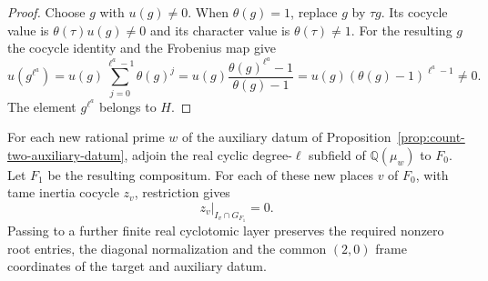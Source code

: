 \begin{proof}
Choose \(g\) with \(u(g)\ne0\). When \(\theta(g)=1\), replace \(g\)
by \(\tau g\). Its cocycle value is \(\theta(\tau)u(g)\ne0\) and
its character value is \(\theta(\tau)\ne1\).
For the resulting \(g\) the cocycle identity and the Frobenius map give
\[
 u(g^{\ell^a})=u(g)\sum_{j=0}^{\ell^a-1}\theta(g)^j
 =u(g)\frac{\theta(g)^{\ell^a}-1}{\theta(g)-1}
 =u(g)(\theta(g)-1)^{\ell^a-1}\ne0 .
\]
The element \(g^{\ell^a}\) belongs to \(H\).
\end{proof}

\begin{proposition}\label{prop:count-two-tame-return}
For each new rational prime \(w\) of the auxiliary datum of
Proposition~\ref{prop:count-two-auxiliary-datum}, adjoin the real
cyclic degree-\(\ell\) subfield of \(\mathbb Q(\mu_w)\) to \(F_0\).
Let \(F_1\) be the resulting compositum. For each of these new
places \(v\) of \(F_0\), with tame inertia cocycle \(z_v\), restriction gives
\[
                          z_v|_{I_v\cap G_{F_1}}=0 .
\]
Passing to a further finite real cyclotomic layer preserves the
required nonzero root entries, the diagonal normalization and the
common \((2,0)\) frame coordinates of the target and auxiliary datum.
\end{proposition}

